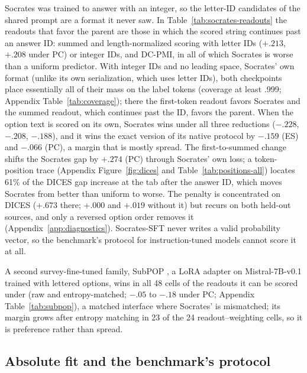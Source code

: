 \documentclass[11pt]{article}
\newcommand{\ES}{\textsc{ES}}
\newcommand{\PC}{\textsc{PC}}
\begin{document}
Socrates was trained to answer with an integer, so the letter-ID candidates
of the shared prompt are a format it never saw.
In Table~\ref{tab:socrates-readouts} the readouts that favor the parent are those in which the scored string continues past an answer ID: summed and
length-normalized scoring with letter IDs ($+.213$, $+.208$ under \PC{}) or integer IDs, and DC-PMI, in all of which Socrates is worse than a uniform predictor. With integer IDs and no leading space, Socrates' own format (unlike its own serialization, which uses letter IDs), both checkpoints place essentially all of their mass on the label tokens (coverage at least .999; Appendix Table~\ref{tab:coverage}); there the first-token readout favors Socrates and the summed readout, which continues past the ID, favors the parent. When the option text is scored on its own, Socrates wins under all three
reductions ($-.228$, $-.208$, $-.188$), and it wins the exact version of its native protocol by $-.159$ (\ES{}) and $-.066$ (\PC{}), a margin that is mostly spread. The first-to-summed change shifts the Socrates gap by $+.274$ (\PC{}) through Socrates' own loss; a token-position trace (Appendix Figure~\ref{fig:dices} and Table~\ref{tab:positions-all}) locates 61\% of the DICES gap increase at the tab after the answer ID, which moves Socrates from better than uniform to worse. The penalty is concentrated on DICES ($+.673$ there; $+.000$ and $+.019$ without it) but recurs on both held-out sources, and only a reversed option order removes it (Appendix~\ref{app:diagnostics}). Socrates-SFT never writes a valid probability vector, so the benchmark's protocol for instruction-tuned models cannot score it at all.

A second survey-fine-tuned family, SubPOP \cite{suh2025subpop}, a LoRA adapter on Mistral-7B-v0.1 trained with lettered options, wins in all 48 cells of the readouts it can be scored under (raw and entropy-matched; $-.05$ to $-.18$ under \PC{}; Appendix Table~\ref{tab:subpop}), a matched interface where Socrates' is mismatched; its margin grows after entropy matching in 23 of the 24 readout--weighting cells, so it is preference rather than spread.

\subsection{Absolute fit and the benchmark's protocol}
\label{sec:absolute}
\end{document}
